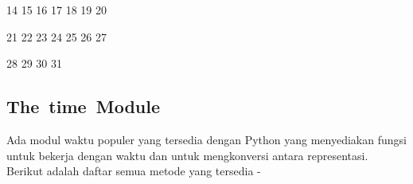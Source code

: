 \documentclass[a4paper,12pt]{report}
\begin{document}
\noindent 
{\fontsize{9pt}{9pt}\selectfont  \hspace*{0.5in}  \hspace*{0.5in} 14 15 16 17 18 19 20} \par
\noindent 
{\fontsize{9pt}{9pt}\selectfont  \hspace*{0.5in}  \hspace*{0.5in} 21 22 23 24 25 26 27} \par
\noindent 
{\fontsize{9pt}{9pt}\selectfont  \hspace*{0.5in}  \hspace*{0.5in} 28 29 30 31} \par
\vspace{9pt}
\vspace{20pt}
\vspace{12pt}
\subsection*{The time Module}
 \par
\begin{adjustwidth}{0.03in}{0.03in}
 \hspace*{0.5in} Ada modul waktu populer yang tersedia dengan Python yang menyediakan fungsi untuk bekerja dengan waktu dan untuk mengkonversi antara representasi. Berikut adalah daftar semua metode yang tersedia -\end{adjustwidth}
 \par


\end{document}
